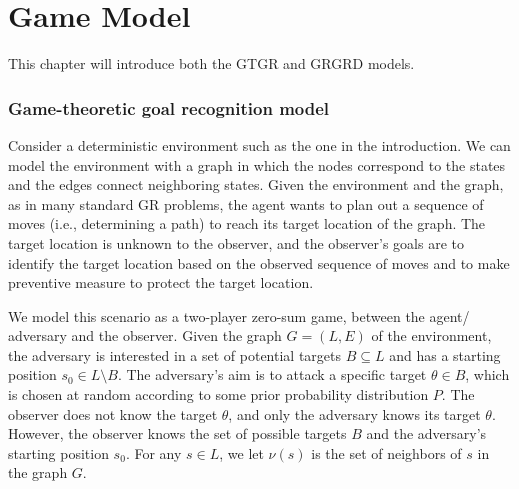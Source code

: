 %
%
\chapter{Game Model}
This chapter will introduce both the 
GTGR and GRGRD models. 

\subsection{Game-theoretic goal recognition model}\label{sec:game_basic}
Consider a deterministic environment such as the one in the introduction. 
We can model the environment with a graph 
in which the nodes correspond to the states  
and the edges connect neighboring states. 
Given the environment and the graph, as in many standard GR problems, 
the agent wants to plan out a sequence of moves (i.e., determining a path) 
to reach its target location of the graph.
The target location is unknown to the observer, and the observer's
goals are to identify the target location based on the observed sequence of moves 
and to make preventive measure to protect the target location. 

We model this scenario as a two-player zero-sum game, between the agent/ adversary
and the observer. Given the graph $G = (L, E)$ of the environment, 
the adversary is interested in a set of potential targets $B \subseteq L$ 
and has a starting position $s_0 \in L \setminus B$. 
The adversary's aim is to attack a specific target $\theta \in B$, which 
is chosen at random according to some prior probability distribution $P$. 
The observer does not know the target $\theta$, and only the adversary knows its target $\theta$.  
However, the observer knows the set of possible targets $B$ and the adversary's starting position $s_0$. 
For any $s \in L$, we let $\nu(s)$ is the set of neighbors of $s$ in the graph $G$. 

